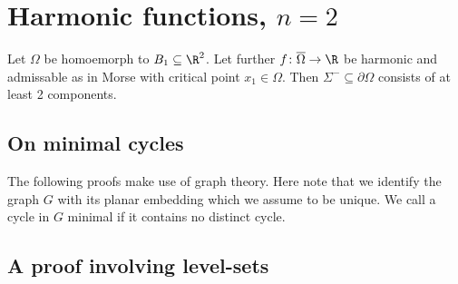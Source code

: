 \section{Harmonic functions, $n=2$}


\begin{proposition}
  Let $\Omega$ be homoemorph to $B_1\subseteq\R^2$. Let further $f\colon\overline{\Omega}\to\R$ be harmonic and admissable 
  as in Morse with critical point $x_1\in\Omega$. Then $\Sigma^-\subseteq\partial\Omega$ consists of at least 2 components.
\end{proposition}

\subsection{On minimal cycles}

The following proofs make use of graph theory.
Here note that we identify the graph $G$ with its planar embedding which we assume to be unique.
We call a cycle in $G$ minimal if it contains no distinct cycle.


\subsection{A proof involving level-sets}

